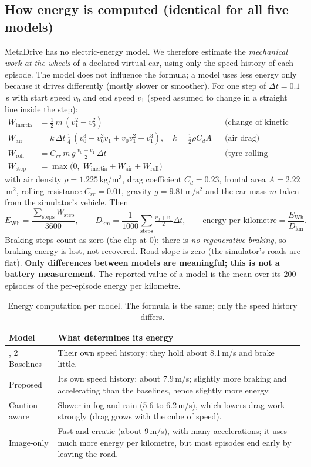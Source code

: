 \documentclass[11pt,a4paper]{article}
\begin{document}
\subsection{How energy is computed (identical for all five models)}\label{sec:energy}
MetaDrive has no electric-energy model. We therefore estimate the \emph{mechanical work at the wheels} of a declared virtual car, using only the speed history of each episode. The model does not influence the formula; a model uses less energy only because it drives differently (mostly slower or smoother). For one step of $\Delta t=0.1$\,s with start speed $v_0$ and end speed $v_1$ (speed assumed to change in a straight line inside the step):
\begin{align*}
W_{\text{inertia}} &= \tfrac12\, m\,(v_1^2-v_0^2) &&\text{(change of kinetic energy)}\\
W_{\text{air}} &= k\,\Delta t\,\tfrac14\,(v_0^3+v_0^2v_1+v_0v_1^2+v_1^3), \quad k=\tfrac12\rho C_dA &&\text{(air drag)}\\
W_{\text{roll}} &= C_{rr}\,m\,g\,\tfrac{v_0+v_1}{2}\,\Delta t &&\text{(tyre rolling resistance)}\\
W_{\text{step}} &= \max\big(0,\;W_{\text{inertia}}+W_{\text{air}}+W_{\text{roll}}\big)
\end{align*}
with air density $\rho=1.225$\,kg/m$^3$, drag coefficient $C_d=0.23$, frontal area $A=2.22$\,m$^2$, rolling resistance $C_{rr}=0.01$, gravity $g=9.81$\,m/s$^2$ and the car mass $m$ taken from the simulator's vehicle. Then
\[
E_{\text{Wh}}=\frac{\sum_{\text{steps}}W_{\text{step}}}{3600},\qquad D_{\text{km}}=\frac{1}{1000}\sum_{\text{steps}}\tfrac{v_0+v_1}{2}\Delta t,\qquad \text{energy per kilometre}=\frac{E_{\text{Wh}}}{D_{\text{km}}}.
\]
Braking steps count as zero (the clip at 0): there is \emph{no regenerative braking}, so braking energy is lost, not recovered. Road slope is zero (the simulator's roads are flat). \textbf{Only differences between models are meaningful; this is not a battery measurement.} The reported value of a model is the mean over its 200 episodes of the per-episode energy per kilometre.
\begin{table}[H]\centering\small
\caption{Energy computation per model. The formula is the same; only the speed history differs.}\label{tab:energy}
\begin{tabularx}{\textwidth}{@{}>{\raggedright\arraybackslash}p{4.3cm}X@{}}\toprule
Model & What determines its energy\\\midrule
1, 2 Baselines & Their own speed history: they hold about 8.1\,m/s and brake little.\\
3 Proposed & Its own speed history: about 7.9\,m/s; slightly more braking and accelerating than the baselines, hence slightly more energy.\\
4 Caution-aware & Slower in fog and rain (5.6 to 6.2\,m/s), which lowers drag work strongly (drag grows with the cube of speed).\\
5 Image-only & Fast and erratic (about 9\,m/s), with many accelerations; it uses much more energy per kilometre, but most episodes end early by leaving the road.\\\bottomrule
\end{tabularx}
\end{table}
\end{document}
